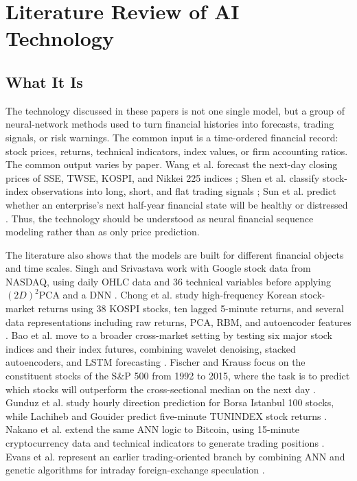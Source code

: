 \documentclass[conference]{IEEEtran}
\begin{document}
\section{Literature Review of AI Technology}

\subsection{What It Is}
The technology discussed in these papers is not one single model, but a group of neural-network methods used to turn financial histories into forecasts, trading signals, or risk warnings. The common input is a time-ordered financial record: stock prices, returns, technical indicators, index values, or firm accounting ratios. The common output varies by paper. Wang et al. forecast the next-day closing prices of SSE, TWSE, KOSPI, and Nikkei 225 indices \cite{wang2016elman}; Shen et al. classify stock-index observations into long, short, and flat trading signals \cite{shen2018gru}; Sun et al. predict whether an enterprise's next half-year financial state will be healthy or distressed \cite{sun2011sffs}. Thus, the technology should be understood as neural financial sequence modeling rather than as only price prediction.

The literature also shows that the models are built for different financial objects and time scales. Singh and Srivastava work with Google stock data from NASDAQ, using daily OHLC data and 36 technical variables before applying $(2D)^2$PCA and a DNN \cite{singh2017stock}. Chong et al. study high-frequency Korean stock-market returns using 38 KOSPI stocks, ten lagged 5-minute returns, and several data representations including raw returns, PCA, RBM, and autoencoder features \cite{chong2017deep}. Bao et al. move to a broader cross-market setting by testing six major stock indices and their index futures, combining wavelet denoising, stacked autoencoders, and LSTM forecasting \cite{bao2017deep}. Fischer and Krauss focus on the constituent stocks of the S\&P 500 from 1992 to 2015, where the task is to predict which stocks will outperform the cross-sectional median on the next day \cite{fischer2018deep}. Gunduz et al. study hourly direction prediction for Borsa Istanbul 100 stocks, while Lachiheb and Gouider predict five-minute TUNINDEX stock returns \cite{gunduz2017intraday,lachiheb2018hierarchical}. Nakano et al. extend the same ANN logic to Bitcoin, using 15-minute cryptocurrency data and technical indicators to generate trading positions \cite{nakano2018bitcoin}. Evans et al. represent an earlier trading-oriented branch by combining ANN and genetic algorithms for intraday foreign-exchange speculation \cite{evans2013utilizing}.
\end{document}
